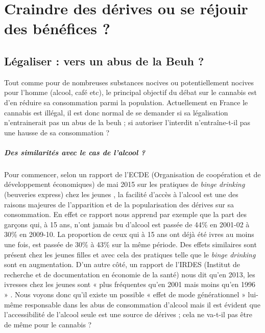 \chapter{Craindre des dérives ou se réjouir des bénéfices ?}

\section{Légaliser : vers un abus de la Beuh ?}

Tout comme pour de nombreuses substances nocives ou potentiellement nocives pour l’homme (alcool, café etc), le principal objectif du débat sur le cannabis est d’en réduire sa consommation parmi la population. Actuellement en France le cannabis est illégal, il est donc normal de se demander si sa légalisation n’entrainerait pas un abus de la beuh ; si autoriser l’interdit n’entraîne-t-il pas une hausse de sa consommation ?

\paragraph{Des similarités avec le cas de l'alcool ?}

 	Pour commencer, selon un rapport de l’ECDE (Organisation de coopération et de développement économiques) de mai 2015 sur les pratiques de \textit{binge drinking} (beuveries express) chez les jeunes \cite{oecd}, la facilité d’accès à l’alcool est une des raisons majeures de l’apparition et de la popularisation des dérives sur sa consommation. En effet ce rapport nous apprend par exemple que la part des garçons qui, à 15 ans, n’ont jamais bu d’alcool est passée de 44\% en 2001-02 à 30\% en 2009-10. La proportion de ceux qui à 15 ans ont déjà été ivres au moins une fois, est passée de 30\% à 43\% sur la même période. Des effets similaires sont présent chez les jeunes filles et avec cela des pratiques telle que le \textit{binge drinking} sont en augmentation. D’un autre côté, un rapport de l’IRDES (Institut de recherche et de documentation en économie de la santé) nous dit qu’en 2013, les ivresses chez les jeunes sont « plus fréquentes qu’en 2001 mais moins qu’en 1996 » \cite{irdes}. Nous voyons donc qu’il existe un possible « effet de mode générationnel » lui-même responsable dans les abus de consommation d’alcool mais il est évident que l’accessibilité de l’alcool seule est une source de dérives ; cela ne va-t-il pas être de même pour le cannabis ? 
    
